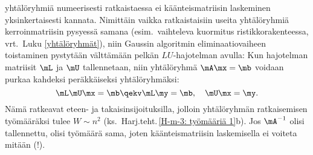 yhtälöryhmiä numeerisesti ratkaistaessa ei käänteismatriisin laskeminen yksinkertaisesti 
kannata. Nimittäin vaikka ratkaistaisiin useita yhtälöryhmiä kerroinmatriisin 
pysyessä samana (esim.\ vaihteleva kuormitus ristikkorakenteessa, vrt.\ Luku 
\ref{yhtälöryhmät}), niin Gaussin algoritmin eliminaatiovaiheen toistaminen pystytään
välttämään pelkän $LU$-hajotelman avulla: Kun hajotelman matriisit $\mL$ ja $\mU$ tallennetaan, 
niin yhtälöryhmä $\mA \mx = \mb$ voidaan purkaa kahdeksi peräkkäiseksi yhtälöryhmäksi:
\[ 
\mL\mU\mx=\mb \qekv \mL \my = \mb, \quad \mU \mx = \my. 
\]
Nämä ratkeavat eteen- ja takaisinsijoituksilla, jolloin yhtälöryhmän ratkaisemisen työmääräksi
tulee $W \sim n^2$ (ks.\ Harj.teht.\,\ref{H-m-3: työmääriä 1}b). Jos $\mA^{-1}$ olisi
tallennettu, olisi työmäärä sama, joten käänteismatriisin laskemisella ei voiteta mitään (!). 

